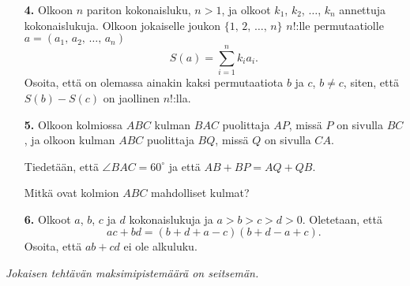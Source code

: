 \documentclass[12pt]{article}
\begin{document}
\vspace{0.5in}
\begin{enumerate}
\item[\textbf{4.}]
Olkoon $n$ pariton kokonaisluku, $n>1$, ja olkoot  $k_1$, $k_2$, $\dots$,
$k_n$ annettuja kokonaislukuja. Olkoon jokaiselle joukon
$\{1,\,2,\,\dots,\,n\}$ $n!$:lle permutaatiolle $a=(a_1,\, a_2,\, \dots,\,
a_n)$
\[
S(a) = \sum_{i=1}^n k_i a_i.
\]
Osoita, ett\"a on olemassa ainakin kaksi permutaatiota $b$ ja  $c$,
$b \neq c$, siten, ett\"a  $S(b) - S(c)$ on jaollinen $n!$:lla.

\vspace{0.5in}
\item[\textbf{5.}]
Olkoon kolmiossa $ABC$  kulman $BAC$ puolittaja $AP$, miss\"a
$P$ on sivulla  $BC$, ja olkoon  kulman $ABC$ puolittaja $BQ$, miss\"a $Q$ on
sivulla $CA$.

Tiedet\"a\"an, ett\"a  $\angle BAC = 60^{\circ}$ ja ett\"a
$AB+BP = AQ+QB$.

Mitk\"a ovat kolmion $ABC$ mahdolliset kulmat?

\vspace{0.5in}
\item[\textbf{6.}]
Olkoot  $a$, $b$, $c$ ja $d$  kokonaislukuja ja  $a>b>c>d>0$. Oletetaan,
ett\"a \[
ac+bd = (b+d+a-c)(b+d-a+c).
\]
Osoita, ett\"a $ab+cd$ ei ole alkuluku.

\end{enumerate}
\vspace{1in}
\noindent \textit{Jokaisen teht\"av\"an maksimipistem\"a\"ar\"a on
seitsem\"an.}
\end{document}
